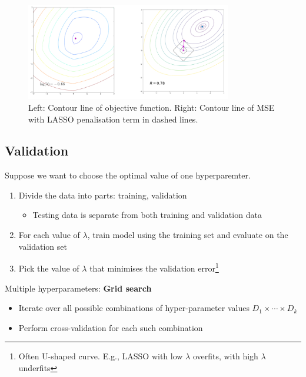 \documentclass[11pt, %
	oneside, %
	english, %
	onehalfspacing, %
	parskip, %
	]{article} %
\theoremstyle{definition}
\begin{document}
\begin{figure}[ht!]
    \caption{Left: Contour line of objective function. Right: Contour line of MSE with LASSO penalisation term in dashed lines.}
    \label{fig.lasso}
    \begin{center}
        \includegraphics[width = 0.8\textwidth]{lasso_cont.pdf}
    \end{center}
\end{figure}


\subsection{Validation}


Suppose we want to choose the optimal value of one hyperparemter.

\begin{enumerate}
	\item Divide the data into parts: training, validation
	\begin{itemize}
		\item Testing data is separate from both training and validation data
	\end{itemize}
	\item For each value of $\lambda$, train model using the training set and evaluate on the validation set
	\item Pick the value of $\lambda$ that minimises the validation error\footnote{Often U-shaped curve. E.g., LASSO with low $\lambda$ overfits, with high $\lambda$ underfits}
\end{enumerate}

Multiple hyperparameters: \textbf{Grid search}

\begin{itemize}
	\item Iterate over all possible combinations of hyper-parameter values $D_1 \times \cdots \times D_k$
	\item Perform cross-validation for each such combination
\end{itemize}
\end{document}
